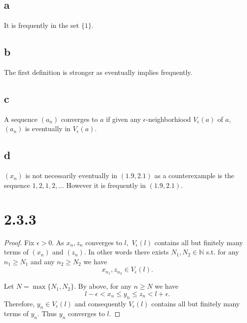 \documentclass[10pt]{article}
\begin{document}
 \subsection*{a}
 It is frequently in the set $\{1\}$.

 \subsection*{b}
 The first definition is stronger as eventually implies frequently.

 \subsection*{c}
A sequence $(a_n)$ converges to $a$ if given any $\epsilon$-neighborhiood $V_\epsilon(a)$ of $a,$ $(a_n)$ is eventually in $V_\epsilon(a).$

\subsection*{d}
$(x_n)$ is not necessarily eventually in $(1.9, 2.1)$ as a counterexample is the sequence $1,2,1,2,...$ However it is frequently in $(1.9,2.1).$

\section*{2.3.3}
\begin{proof}
    Fix $\epsilon>0.$ As $x_n, z_n$ converges to $l,$ $V_\epsilon(l)$ contains all but finitely many terms of $(x_n)$ and  $(z_n)$. In other words there exists $N_1, N_2\in\mathbb{N}$ s.t. for any $n_1\ge N_1$ and any $n_2\ge N_2$ we have \[x_{n_1}, z_{n_2}\in V_\epsilon(l).\]

    Let $N =\max \{N_1, N_2\}.$ By above,
    for any $n\ge N$ we have 
    \[l-\epsilon < x_n \le y_n \le z_n < l + \epsilon.\] 
    Therefore, $y_n \in V_\epsilon(l)$ and consequently $V_\epsilon(l)$ contains all but finitely many terms of $y_n.$ Thus $y_n$ converges to $l.$
\end{proof}
\end{document}
